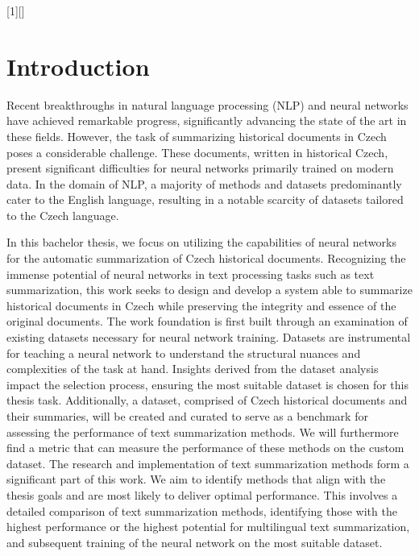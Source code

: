\documentclass[english, ba, kiv, he, iso690numb, pdf, viewonly]{fasthesis}
\begin{document}
[1][]
{
    \lstset{style=FASThesisPythonStyle, language=Python, #1}
}
{
}

%
%
%
%
\setcounter{page}{1}
\chapter{Introduction}
Recent breakthroughs in natural language processing (NLP) and neural networks have achieved remarkable progress, significantly advancing the state of the art in these fields. However, the task of summarizing historical documents in Czech poses a considerable challenge. These documents, written in historical Czech, present significant difficulties for neural networks primarily trained on modern data. In the domain of NLP, a majority of methods and datasets predominantly cater to the English language, resulting in a notable scarcity of datasets tailored to the Czech language.

In this bachelor thesis, we focus on utilizing the capabilities of neural networks for the automatic summarization of Czech historical documents. Recognizing the immense potential of neural networks in text processing tasks such as text summarization, this work seeks to design and develop a system able to summarize historical documents in Czech while preserving the integrity and essence of the original documents. The work foundation is first built through an examination of existing datasets necessary for neural network training. Datasets are instrumental for teaching a neural network to understand the structural nuances and complexities of the task at hand. Insights derived from the dataset analysis impact the selection process, ensuring the most suitable dataset is chosen for this thesis task. Additionally, a dataset, comprised of Czech historical documents and their summaries, will be created and curated to serve as a benchmark for assessing the performance of text summarization methods. We will furthermore find a metric that can measure the performance of these methods on the custom dataset. The research and implementation of text summarization methods form a significant part of this work. We aim to identify methods that align with the thesis goals and are most likely to deliver optimal performance. This involves a detailed comparison of text summarization methods, identifying those with the highest performance or the highest potential for multilingual text summarization, and subsequent training of the neural network on the most suitable dataset.
\end{document}

